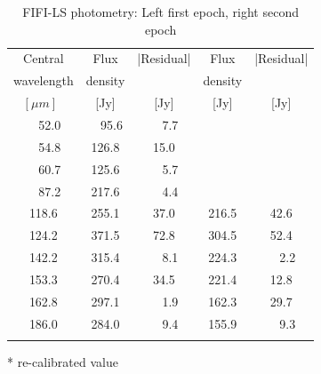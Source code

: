 
\begin{table}
\begin{threeparttable}
\caption[]{FIFI-LS photometry: Left first epoch, right second epoch}
         \label{fifiphot}
         \begin{tabular}{ccccc}
            \hline
            \noalign{\smallskip}
            Central      &  Flux & |Residual|&  Flux & |Residual| \\
            wavelength & density & & density & \\
            $[\mu m]$\ & [Jy] & [Jy]& [Jy] & [Jy] \\
            \noalign{\smallskip}
            \hline
            \noalign{\smallskip}
             ~~52.0 &  ~~95.6 &  ~~7.7 & &\\
             ~~54.8 & 126.8 & 15.0 & &\\
             ~~60.7 & 125.6 &  ~~5.7 & &\\
             ~~87.2 & 217.6 &  ~~4.4 & &\\
            118.6 & 255.1\tnote{*} & 37.0 & 216.5\tnote{*} & 42.6 \\
            124.2 & 371.5 & 72.8 & 304.5 & 52.4 \\
            142.2 & 315.4 &  ~~8.1 & 224.3 &  ~~2.2 \\
            153.3 & 270.4 & 34.5 & 221.4 & 12.8 \\
            162.8 & 297.1 &  ~~1.9 & 162.3 & 29.7 \\
            186.0 & 284.0 &  ~~9.4 & 155.9 &  ~~9.3 \\
            \noalign{\smallskip}
            \hline
         \end{tabular}
         \begin{tablenotes}\footnotesize
\item[*] re-calibrated value
\end{tablenotes}
 \end{threeparttable}        
\end{table}


